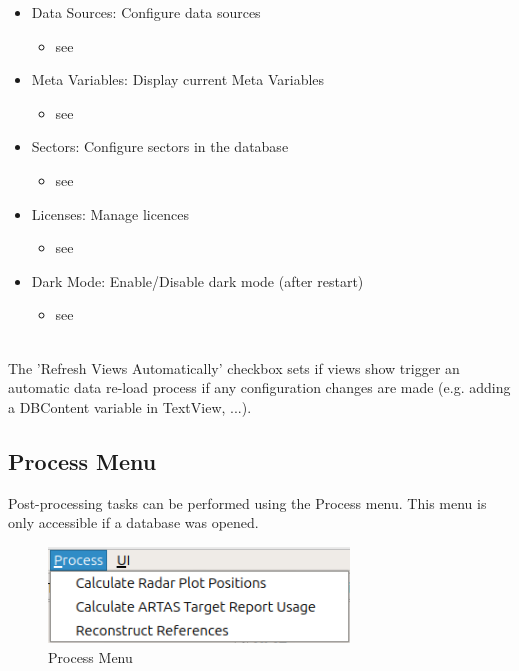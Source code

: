 \begin{itemize}
 \item Data Sources: Configure data sources
  \begin{itemize}
 \item see 
 \end{itemize}
 \item Meta Variables: Display current Meta Variables
  \begin{itemize}
 \item see 
 \end{itemize}
 \item Sectors: Configure sectors in the database
 \begin{itemize}
 \item see 
 \end{itemize}
  \item Licenses: Manage licences
 \begin{itemize}
 \item see 
 \end{itemize}
   \item Dark Mode: Enable/Disable dark mode (after restart)
 \begin{itemize}
 \item see 
 \end{itemize}
\end{itemize}
\  \\

The 'Refresh Views Automatically' checkbox sets if views show trigger an automatic data re-load process if any configuration changes are made (e.g. adding a DBContent variable in TextView, ...).

\subsection{Process Menu}
\label{sec:ui_overview_process_menu}

Post-processing tasks can be performed using the Process menu. This menu is only accessible if a database was opened.

\begin{figure}[H]
  \center
    \includegraphics[width=8cm,frame]{figures/ui_process_menu.png}
  \caption{Process Menu}
\end{figure}


